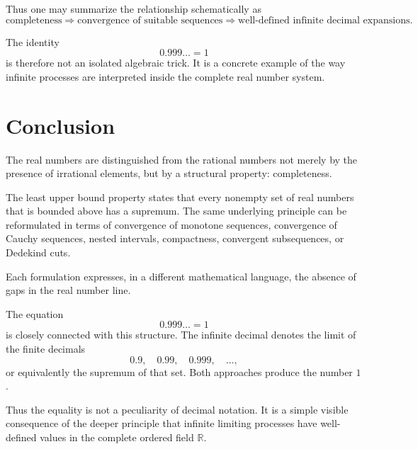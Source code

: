 \documentclass{essay}
\begin{document}
Thus one may summarize the relationship schematically as
\[ \text{completeness} \Longrightarrow \text{convergence of suitable sequences} \Longrightarrow \text{well-defined infinite decimal expansions}. \]

The identity
\[ 0.999\ldots=1 \]
is therefore not an isolated algebraic trick. It is a concrete example of the way infinite processes are interpreted inside the complete real number system.

\section{Conclusion}

The real numbers are distinguished from the rational numbers not merely by the presence of irrational elements, but by a structural property: completeness.

The least upper bound property states that every nonempty set of real numbers that is bounded above has a supremum. The same underlying principle can be reformulated in terms of convergence of monotone sequences, convergence of Cauchy sequences, nested intervals, compactness, convergent subsequences, or Dedekind cuts.

Each formulation expresses, in a different mathematical language, the absence of gaps in the real number line.

The equation
\[ 0.999\ldots=1 \]
is closely connected with this structure. The infinite decimal denotes the limit of the finite decimals
\[ 0.9,\quad0.99,\quad0.999,\quad\ldots, \]
or equivalently the supremum of that set. Both approaches produce the number \(1\).

Thus the equality is not a peculiarity of decimal notation. It is a simple visible consequence of the deeper principle that infinite limiting processes have well-defined values in the complete ordered field \(\mathbb{R}\).
\end{document}
